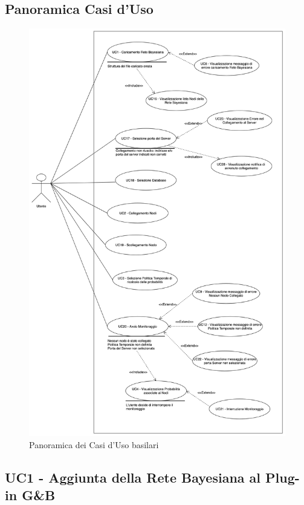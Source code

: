 \subsection{Panoramica Casi d'Uso}\label{PanoramicaUC}
\begin{figure}[H]
	\begin{center}
		\includegraphics[scale=0.2]{./images/VistaUC.png}
		 \caption{Panoramica dei Casi d'Uso basilari}	
	\end{center}
\end{figure}

\pagebreak
\subsection{UC1 - Aggiunta della Rete Bayesiana al Plug-in G\&B}\label{UC1}


